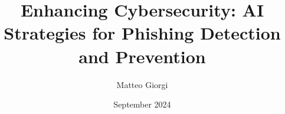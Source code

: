 \documentclass[11pt,a4paper,oneside]{book} %
\title{Enhancing Cybersecurity: AI Strategies for Phishing Detection and Prevention}
\author{
  Matteo Giorgi
}
\date{September 2024}
\numberwithin{equation}{section}
\begin{document}
\maketitle
\tableofcontents
\listoffigures
\newpage


\resetpagenumbering

 


\end{document}
